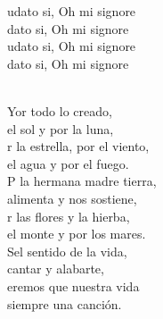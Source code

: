 \begin{cancion}[Laudato][]%
	\begin{chorus}%
	udato si, Oh mi signore\\
	dato si, Oh mi signore\\
	udato si, Oh mi signore\\
	dato si, Oh mi signore\\
	\end{chorus}%
	\jump\\
	Yor todo lo creado,\\
	 el sol y por la luna,\\
	r la estrella, por el viento,\\
	 el agua y por el fuego.\\
\jump
	P la hermana madre tierra,\\
	 alimenta y nos sostiene,\\
	r las flores y la hierba,\\
	 el monte y por los mares.\\
\jump
	Sel sentido de la vida,\\
	cantar y alabarte,\\
	eremos que nuestra vida\\
	 siempre una canción.\\
\end{cancion}%
